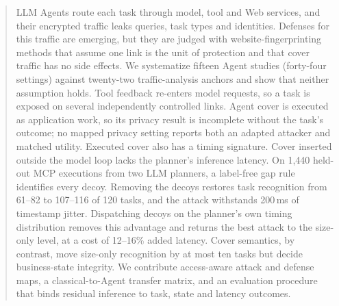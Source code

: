 \begin{abstract}
LLM Agents route each task through model, tool and Web services, and their encrypted traffic leaks queries, task types and identities. Defenses for this traffic are emerging, but they are judged with website-fingerprinting methods that assume one link is the unit of protection and that cover traffic has no side effects. We systematize fifteen Agent studies (forty-four settings) against twenty-two traffic-analysis anchors and show that neither assumption holds. Tool feedback re-enters model requests, so a task is exposed on several independently controlled links. Agent cover is executed as application work, so its privacy result is incomplete without the task's outcome; no mapped privacy setting reports both an adapted attacker and matched utility. Executed cover also has a timing signature. Cover inserted outside the model loop lacks the planner's inference latency. On 1,440 held-out MCP executions from two LLM planners, a label-free gap rule identifies every decoy. Removing the decoys restores task recognition from 61--82 to 107--116 of 120 tasks, and the attack withstands 200\,ms of timestamp jitter. Dispatching decoys on the planner's own timing distribution removes this advantage and returns the best attack to the size-only level, at a cost of 12--16\% added latency. Cover semantics, by contrast, move size-only recognition by at most ten tasks but decide business-state integrity. We contribute access-aware attack and defense maps, a classical-to-Agent transfer matrix, and an evaluation procedure that binds residual inference to task, state and latency outcomes.
\end{abstract}
